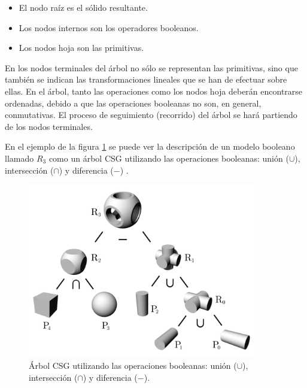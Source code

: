 \begin{itemize}
\item El nodo raíz es el sólido resultante.
\item Los nodos internos son los operadores booleanos.
\item Los nodos hoja son las primitivas.
\end{itemize}

En los nodos terminales del árbol no sólo se representan las primitivas, sino que también se indican las transformaciones lineales que se han de efectuar sobre ellas. En el árbol, tanto las operaciones como los nodos hoja deberán encontrarse ordenadas, debido a que las operaciones booleanas no son, en general, conmutativas. El proceso de seguimiento (recorrido) del árbol se hará partiendo de los nodos terminales.



En el ejemplo de la figura \ref{fig:bool} se puede ver la descripción de un modelo booleano  llamado $R_3$ como un árbol CSG utilizando las operaciones booleanas: unión ($\cup$), intersección ($\cap$) y diferencia ($-$) \citep{Wassermann_2016}.

\begin{figure}[ht]
\includegraphics[width=10cm]{Img/GEO/geo-booleano6.png}
\centering
\caption{\footnotesize{Árbol CSG utilizando las   operaciones booleanas: unión ($\cup$), intersección ($\cap$) y diferencia ($-$). %
}}
\label{fig:bool}
\end{figure}


